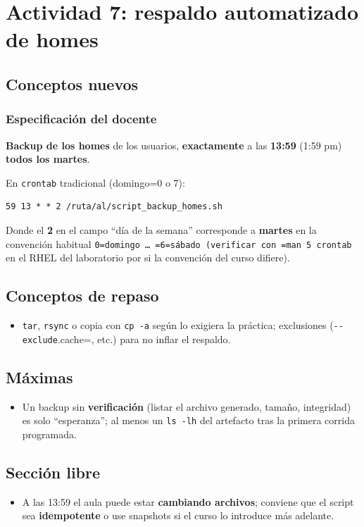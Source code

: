 \documentclass[11pt, letterpaper]{article}
\begin{document}
\section{Actividad 7: respaldo automatizado de homes}
\label{sec:orgb1d3844}

\subsection{Conceptos nuevos}
\label{sec:orgc8a0938}

\subsubsection{Especificación del docente}
\label{sec:org20cf3b1}
\textbf{Backup de los homes} de los usuarios, \textbf{exactamente} a las \textbf{13:59} (1:59 pm) \textbf{todos los martes}.

En \texttt{crontab} tradicional (domingo=0 o 7):

\begin{verbatim}
59 13 * * 2 /ruta/al/script_backup_homes.sh
\end{verbatim}

Donde el \textbf{2} en el campo “día de la semana” corresponde a \textbf{martes} en la convención habitual \texttt{0=domingo … =6=sábado (verificar con =man 5 crontab} en el RHEL del laboratorio por si la convención del curso difiere).
\subsection{Conceptos de repaso}
\label{sec:org7419675}

\begin{itemize}
\item \texttt{tar}, \texttt{rsync} o copia con \texttt{cp -a} según lo exigiera la práctica; exclusiones (\texttt{-{}-{}exclude}.cache=, etc.) para no inflar el respaldo.
\end{itemize}
\subsection{Máximas}
\label{sec:org25cd424}

\begin{itemize}
\item Un backup sin \textbf{verificación} (listar el archivo generado, tamaño, integridad) es solo “esperanza”; al menos un \texttt{ls -lh} del artefacto tras la primera corrida programada.
\end{itemize}
\subsection{Sección libre}
\label{sec:org73fad57}

\begin{itemize}
\item A las 13:59 el aula puede estar \textbf{cambiando archivos}; conviene que el script sea \textbf{idempotente} o use snapshots si el curso lo introduce más adelante.
\end{itemize}
\end{document}
